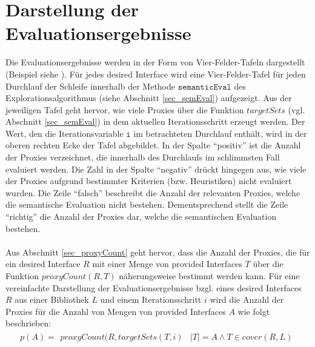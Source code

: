 \section{Darstellung der Evaluationsergebnisse}
Die Evaluationsergebnisse werden in der Form von Vier-Felder-Tafeln dargestellt (Beispiel siehe ). Für jedes desired Interface wird eine Vier-Felder-Tafel für jeden Durchlauf der Schleife innerhalb der Methode $\texttt{semanticEval}$ des Explorationsalgorithmus (siehe Abschnitt \ref{sec_semEval}) aufgezeigt. Aus der jeweiligen Tafel geht hervor, wie viele Proxies über die Funktion $\mathit{targetSets}$ (vgl. Abschnitt \ref{sec_semEval}) in dem aktuellen Iterationsschritt erzeugt werden. Der Wert, den die Iterationsvariable $\texttt{i}$ im betrachteten Durchlauf enthält, wird in der oberen rechten Ecke der Tafel abgebildet.
In der Spalte ``positiv'' ist die Anzahl der Proxies verzeichnet, die innerhalb des Durchlaufs im schlimmsten Fall evaluiert werden. Die Zahl in der Spalte ``negativ'' drückt hingegen aus, wie viele der Proxies aufgrund bestimmter Kriterien (bzw. Heuristiken) nicht evaluiert wurden.  Die Zeile ``falsch'' beschreibt die Anzahl der relevanten Proxies, welche die semantische Evaluation nicht bestehen. Dementsprechend stellt die Zeile ``richtig'' die Anzahl der Proxies dar, welche die semantischen Evaluation bestehen.
\\\\
Aus Abschnitt \ref{sec_proxyCount} geht hervor, dass die Anzahl der Proxies, die für ein desired Interface $R$ mit einer Menge von provided Interfaces $T$ über die Funktion $\mathit{proxyCount(R,T)}$ näherungsweise bestimmt werden kann. Für eine vereinfachte Darstellung der Evaluationsergebnisse bzgl. eines desired Interfaces $R$ aus einer Bibliothek $L$ und einem Iterationsschritt $i$ wird die Anzahl der Proxies für die Anzahl von Mengen von provided Interfaces $A$ wie folgt beschrieben:
\begin{gather*}
p(A) = \begin{array}{l|l}
\mathit{proxyCount(R,targetSets(T,i)} & |T| = A \wedge T \in \mathit{cover(R,L)}
\end{array}
\end{gather*}
\noindent
